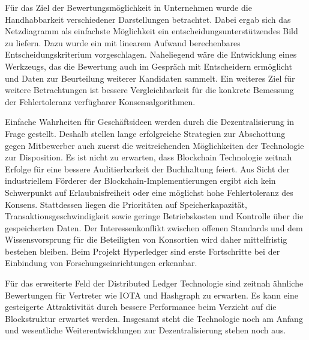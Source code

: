 
Für das Ziel der Bewertungsmöglichkeit in Unternehmen wurde die Handhabbarkeit verschiedener Darstellungen betrachtet.
Dabei ergab sich das Netzdiagramm als einfachste Möglichkeit ein entscheidungsunterstützendes Bild zu liefern.
Dazu wurde ein mit linearem Aufwand berechenbares Entscheidungskriterium vorgeschlagen.
Naheliegend wäre die Entwicklung eines Werkzeugs, das die Bewertung auch im Gespräch mit Entscheidern ermöglicht
und Daten zur Beurteilung weiterer Kandidaten sammelt.
Ein weiteres Ziel für weitere Betrachtungen ist bessere Vergleichbarkeit \ua{} für die konkrete Bemessung der Fehlertoleranz verfügbarer Konsensalgorithmen.

Einfache Wahrheiten für Geschäftsideen werden durch die Dezentralisierung in Frage gestellt.
Deshalb stellen lange erfolgreiche Strategien zur Abschottung gegen Mitbewerber auch zuerst die weitreichenden Möglichkeiten der Technologie zur Disposition.
Es ist nicht zu erwarten, dass Blockchain Technologie zeitnah Erfolge für eine bessere Auditierbarkeit der Buchhaltung feiert.
Aus Sicht der industriellem Förderer der Blockchain-Implementierungen ergibt sich kein Schwerpunkt auf Erlaubnisfreiheit oder eine möglichst hohe Fehlertoleranz des Konsens.
Stattdessen liegen die Prioritäten auf Speicherkapazität, Transaktionsgeschwindigkeit sowie geringe Betriebskosten und Kontrolle über die gespeicherten Daten.
Der Interessenkonflikt zwischen offenen Standards und dem Wissensvorsprung für die Beteiligten von Konsortien wird daher mittelfristig bestehen bleiben.
Beim Projekt Hyperledger sind erste Fortschritte bei der Einbindung von Forschungseinrichtungen erkennbar.

Für das erweiterte Feld der Distributed Ledger Technologie sind zeitnah ähnliche Bewertungen für Vertreter wie IOTA und Hashgraph zu erwarten.
Es kann eine gesteigerte Attraktivität durch bessere Performance beim Verzicht auf die Blockstruktur erwartet werden.
Insgesamt steht die Technologie noch am Anfang und wesentliche Weiterentwicklungen zur Dezentralisierung stehen noch aus.




